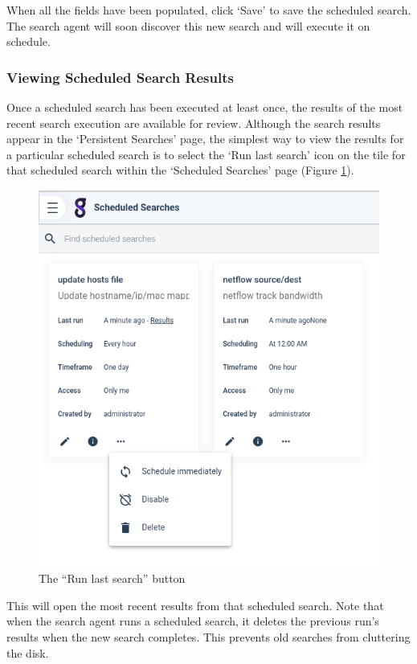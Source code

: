 When all the fields have been populated, click `Save' to save the
scheduled search. The search agent will soon discover this new search
and will execute it on schedule.

\subsubsection{Viewing Scheduled Search Results}

Once a scheduled search has been executed at least once, the results of
the most recent search execution are available for review. Although the
search results appear in the `Persistent Searches' page, the simplest
way to view the results for a particular scheduled search is to select
the `Run last search' icon on the tile for that scheduled search within
the `Scheduled Searches' page (Figure \ref{fig:run-last-search}).

\begin{figure}
	\includegraphics{images/run-last-search.png}
	\caption{The ``Run last search'' button}
	\label{fig:run-last-search}
\end{figure}

This will open the most recent results from that scheduled search. Note
that when the search agent runs a scheduled search, it deletes the
previous run's results when the new search completes. This prevents old
searches from cluttering the disk.

